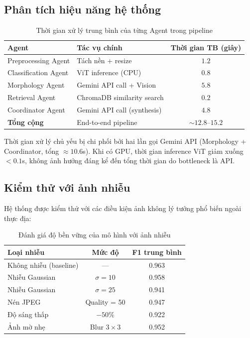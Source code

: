 \documentclass[13pt,a4paper]{extreport}
\begin{document}
\subsection{Phân tích hiệu năng hệ thống}
\begin{table}[H]
\centering
\caption{Thời gian xử lý trung bình của từng Agent trong pipeline}
\label{tab:performance}
\begin{tabular}{llc}
\toprule
\textbf{Agent} & \textbf{Tác vụ chính} & \textbf{Thời gian TB (giây)} \\
\midrule
Preprocessing Agent  & Tách nền + resize           & $1.2$ \\
Classification Agent & ViT inference (CPU)         & $0.8$ \\
Morphology Agent     & Gemini API call + Vision    & $5.8$ \\
Retrieval Agent      & ChromaDB similarity search  & $0.2$ \\
Coordinator Agent    & Gemini API call (synthesis) & $4.8$ \\
\midrule
\textbf{Tổng cộng}   & End-to-end pipeline         & $\sim 12.8$--$15.2$ \\
\bottomrule
\end{tabular}
\end{table}

Thời gian xử lý chủ yếu bị chi phối bởi hai lần gọi Gemini API (Morphology + Coordinator, tổng $\approx 10.6$s). Khi có GPU, thời gian inference ViT giảm xuống $< 0.1$s, không ảnh hưởng đáng kể đến tổng thời gian do bottleneck là API.

\subsection{Kiểm thử với ảnh nhiễu}
Hệ thống được kiểm thử với các điều kiện ảnh không lý tưởng phổ biến ngoài thực địa:

\begin{table}[H]
\centering
\caption{Đánh giá độ bền vững của mô hình với ảnh nhiễu}
\label{tab:noise_test}
\begin{tabular}{lcc}
\toprule
\textbf{Loại nhiễu} & \textbf{Mức độ} & \textbf{F1 trung bình} \\
\midrule
Không nhiễu (baseline) & --- & 0.963 \\
Nhiễu Gaussian  & $\sigma = 10$ & 0.958 \\
Nhiễu Gaussian  & $\sigma = 25$ & 0.941 \\
Nén JPEG        & Quality = 50  & 0.947 \\
Độ sáng thấp    & $-50\%$       & 0.922 \\
Ảnh mờ nhẹ      & Blur $3\times3$ & 0.952 \\
\bottomrule
\end{tabular}
\end{table}
\end{document}
